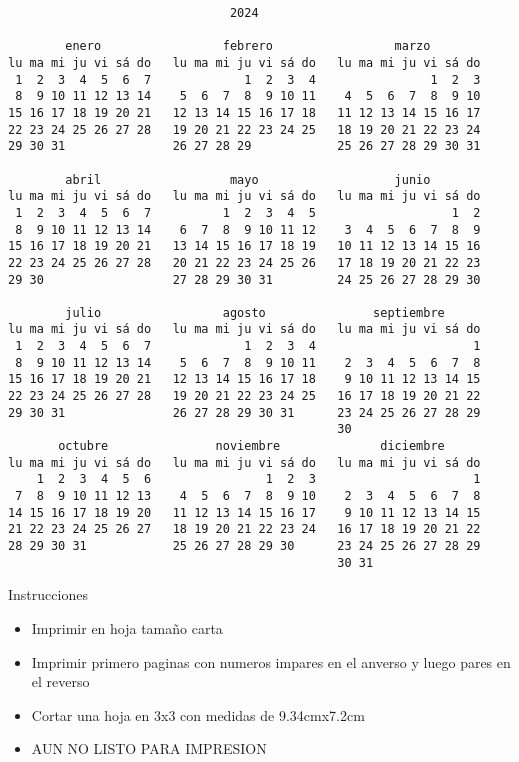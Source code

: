 \documentclass[letterpaper,10pt]{article}
\begin{document}
\begin{multicols}{3}
\begin{center}
\begin{tiny}
\begin{verbatim}                               2024

        enero                 febrero                 marzo
lu ma mi ju vi sá do   lu ma mi ju vi sá do   lu ma mi ju vi sá do
 1  2  3  4  5  6  7             1  2  3  4                1  2  3
 8  9 10 11 12 13 14    5  6  7  8  9 10 11    4  5  6  7  8  9 10
15 16 17 18 19 20 21   12 13 14 15 16 17 18   11 12 13 14 15 16 17
22 23 24 25 26 27 28   19 20 21 22 23 24 25   18 19 20 21 22 23 24
29 30 31               26 27 28 29            25 26 27 28 29 30 31

        abril                  mayo                   junio
lu ma mi ju vi sá do   lu ma mi ju vi sá do   lu ma mi ju vi sá do
 1  2  3  4  5  6  7          1  2  3  4  5                   1  2
 8  9 10 11 12 13 14    6  7  8  9 10 11 12    3  4  5  6  7  8  9
15 16 17 18 19 20 21   13 14 15 16 17 18 19   10 11 12 13 14 15 16
22 23 24 25 26 27 28   20 21 22 23 24 25 26   17 18 19 20 21 22 23
29 30                  27 28 29 30 31         24 25 26 27 28 29 30

        julio                 agosto               septiembre
lu ma mi ju vi sá do   lu ma mi ju vi sá do   lu ma mi ju vi sá do
 1  2  3  4  5  6  7             1  2  3  4                      1
 8  9 10 11 12 13 14    5  6  7  8  9 10 11    2  3  4  5  6  7  8
15 16 17 18 19 20 21   12 13 14 15 16 17 18    9 10 11 12 13 14 15
22 23 24 25 26 27 28   19 20 21 22 23 24 25   16 17 18 19 20 21 22
29 30 31               26 27 28 29 30 31      23 24 25 26 27 28 29
                                              30
       octubre               noviembre              diciembre
lu ma mi ju vi sá do   lu ma mi ju vi sá do   lu ma mi ju vi sá do
    1  2  3  4  5  6                1  2  3                      1
 7  8  9 10 11 12 13    4  5  6  7  8  9 10    2  3  4  5  6  7  8
14 15 16 17 18 19 20   11 12 13 14 15 16 17    9 10 11 12 13 14 15
21 22 23 24 25 26 27   18 19 20 21 22 23 24   16 17 18 19 20 21 22
28 29 30 31            25 26 27 28 29 30      23 24 25 26 27 28 29
                                              30 31\end{verbatim}
\end{tiny}
\end{center}
\vspace{15cm}
Instrucciones
\begin{itemize}
 \item Imprimir en hoja tamaño carta
\item Imprimir primero paginas con numeros impares en el anverso y luego pares en el reverso
\item Cortar una hoja en 3x3 con medidas de 9.34cmx7.2cm
\item AUN NO LISTO PARA IMPRESION
\end{itemize}

\vfill
\end{multicols}
\end{document}
